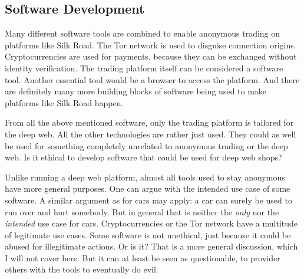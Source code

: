 \subsection{Software Development}

Many different software tools are combined to enable anonymous trading on platforms like Silk Road. The Tor network is used to disguise connection origins. Cryptocurrencies are used for payments, because they can be exchanged without identity verification. The trading platform itself can be considered a software tool. Another essential tool would be a browser to access the platform. And there are definitely many more building blocks of software being used to make platforms like Silk Road happen.

From all the above mentioned software, only the trading platform is tailored for the deep web. All the other technologies are rather just used. They could as well be used for something completely unrelated to anonymous trading or the deep web. Is it ethical to develop software that could be used for deep web shops?

Unlike running a deep web platform, almost all tools used to stay anonymous have more general purposes. One can argue with the intended use case of some software. A similar argument as for cars may apply: a car can surely be used to run over and hurt somebody. But in general that is neither the \emph{only} nor the \emph{intended} use case for cars. Cryptocurrencies or the Tor network have a multitude of legitimate use cases. Some software is not unethical, just because it could be abused for illegitimate actions. Or is it? That is a more general discussion, which I will not cover here. But it can at least be seen as questionable, to provider others with the tools to eventually do evil.